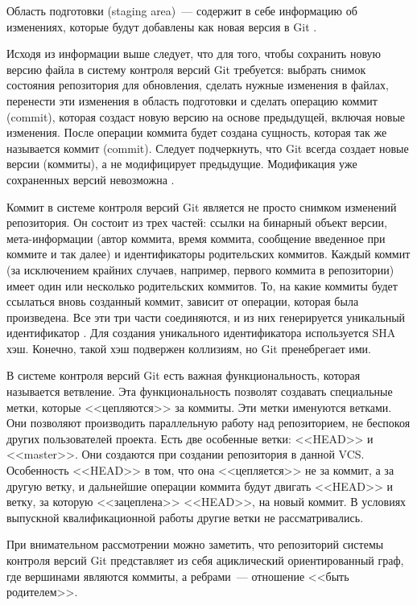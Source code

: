 Область подготовки (staging area)~--- содержит в себе информацию об изменениях, которые будут добавлены как новая версия в Git \cite{pro-git}. 

Исходя из информации выше следует, что для того, чтобы сохранить новую версию файла в систему контроля версий Git требуется: выбрать снимок состояния репозитория для обновления, сделать нужные изменения в файлах, перенести эти изменения в область подготовки и сделать операцию коммит (commit), которая создаст новую версию на основе предыдущей, включая новые изменения. После операции коммита будет создана сущность, которая так же называется коммит (commit). Следует подчеркнуть, что Git всегда создает новые версии (коммиты), а не модифицирует предыдущие. Модификация уже сохраненных версий невозможна \cite{pro-git}.

Коммит в системе контроля версий Git является не просто снимком изменений репозитория. Он состоит из трех частей: ссылки на бинарный объект версии, мета-информации (автор коммита, время коммита, сообщение введенное при коммите и так далее) и идентификаторы родительских коммитов. Каждый коммит (за исключением крайних случаев, например, первого коммита в репозитории) имеет один или несколько родительских коммитов. То, на какие коммиты будет ссылаться вновь созданный коммит, зависит от операции, которая была произведена. Все эти три части соединяются, и из них генерируется уникальный идентификатор \cite{pro-git}. Для создания уникального идентификатора используется SHA хэш. Конечно, такой хэш подвержен коллизиям, но Git пренебрегает ими.

В системе контроля версий Git есть важная функциональность, которая называется ветвление. Эта функциональность позволят создавать специальные метки, которые <<цепляются>> за коммиты. Эти метки именуются ветками. Они позволяют производить параллельную работу над репозиторием, не беспокоя других пользователей проекта. Есть две особенные ветки: <<HEAD>> и <<master>>. Они создаются при создании репозитория в данной VCS. Особенность <<HEAD>> в том, что она <<цепляется>> не за коммит, а за другую ветку, и дальнейшие операции коммита будут двигать <<HEAD>> и ветку, за которую <<зацеплена>> <<HEAD>>, на новый коммит. В условиях выпускной квалификационной работы другие ветки не рассматривались.

При внимательном рассмотрении можно заметить, что репозиторий системы контроля версий Git представляет из себя ациклический ориентированный граф, где вершинами являются коммиты, а ребрами~--- отношение <<быть родителем>>.
